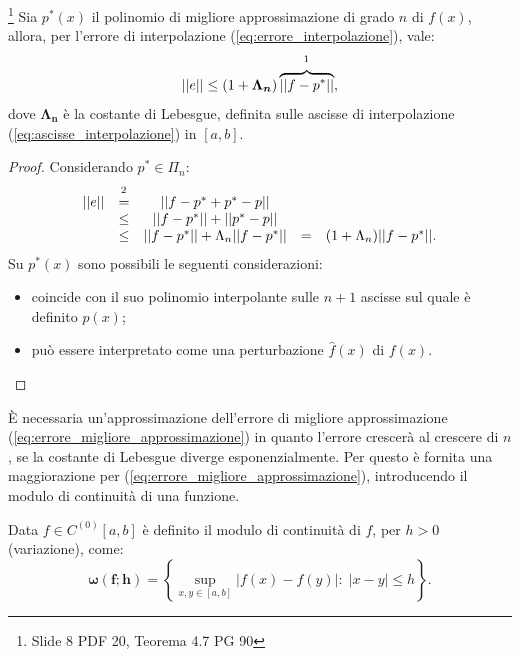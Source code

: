 \begin{theorem}\label{th:approssimazione_errore_migliore_approssimazione}\footnote{Slide 8 PDF 20, Teorema 4.7 PG 90}
    Sia $p^*(x)$ il polinomio di migliore approssimazione di grado $n$ di $f(x)$, allora, per l'errore di interpolazione (\ref{eq:errore_interpolazione}), vale:
    \begin{equation}\label{eq:approssimazione_errore_migliore_approssimazione}
        ||e||\leq (1+\boldsymbol{\Lambda_n})\overbrace{||f-p^*||}^{\footnotemark},
    \end{equation}
    dove $\boldsymbol{\Lambda_n}$ è la costante di Lebesgue, definita sulle ascisse di interpolazione (\ref{eq:ascisse_interpolazione}) in $[a, b]$.
\end{theorem}
\begin{proof}
Considerando $p^*\in\Pi_n$:
    \begin{equation*}
        \begin{matrix}
            ||e||&\overset{\footnotemark}{=}&||f-p^*+p^*-p||\\
            &\leq& ||f-p^*||+||p^*-p||\\
            &\leq& ||f-p^*||+\Lambda_n||f-p^*||
            &=&(1+\Lambda_n)||f-p^*||.
        \end{matrix}
    \end{equation*}
    Su $p^*(x)$ sono possibili le seguenti considerazioni:
    \begin{itemize}
        \item coincide con il suo polinomio interpolante sulle $n+1$ ascisse sul quale è definito $p(x)$;
        \item può essere interpretato come una perturbazione $\widehat f(x)$ di $f(x)$.
    \end{itemize}
\end{proof}

È necessaria un'approssimazione dell'errore di migliore approssimazione (\ref{eq:errore_migliore_approssimazione}) in quanto l'errore crescerà al crescere di $n$, se la costante di Lebesgue diverge esponenzialmente. Per questo è fornita una maggiorazione per (\ref{eq:errore_migliore_approssimazione}), introducendo il modulo di continuità di una funzione.

\begin{definition}
    Data $f\in C^{(0)}[a,b]$ è definito il modulo di continuità di $f$, per $h>0$ (variazione), come:
    \begin{equation}\label{eq:modulo_continuità}
        \boldsymbol{\omega(f;h)}=\left\{\underset{x,y\in [a,b]}{\sup}|f(x)-f(y)|:\; |x-y|\leq h\right\}.
    \end{equation}
\end{definition}

